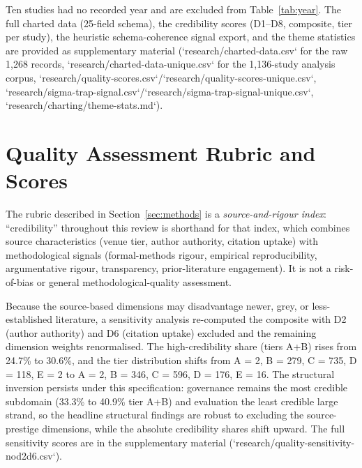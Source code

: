 Ten studies had no recorded year and are excluded from Table~\ref{tab:year}. The full charted data (25-field schema), the credibility scores (D1--D8, composite, tier per study), the heuristic schema-coherence signal export, and the theme statistics are provided as supplementary material (`research/charted-data.csv` for the raw 1,268 records, `research/charted-data-unique.csv` for the 1,136-study analysis corpus, `research/quality-scores.csv`/`research/quality-scores-unique.csv`, `research/sigma-trap-signal.csv`/`research/sigma-trap-signal-unique.csv`, `research/charting/theme-stats.md`).

\section{Quality Assessment Rubric and Scores}\label{app:quality}

The rubric described in Section~\ref{sec:methods} is a \emph{source-and-rigour index}: ``credibility'' throughout this review is shorthand for that index, which combines source characteristics (venue tier, author authority, citation uptake) with methodological signals (formal-methods rigour, empirical reproducibility, argumentative rigour, transparency, prior-literature engagement). It is not a risk-of-bias or general methodological-quality assessment.

Because the source-based dimensions may disadvantage newer, grey, or less-established literature, a sensitivity analysis re-computed the composite with D2 (author authority) and D6 (citation uptake) excluded and the remaining dimension weights renormalised. The high-credibility share (tiers A+B) rises from 24.7\% to 30.6\%, and the tier distribution shifts from A = 2, B = 279, C = 735, D = 118, E = 2 to A = 2, B = 346, C = 596, D = 176, E = 16. The structural inversion persists under this specification: governance remains the most credible subdomain (33.3\% to 40.9\% tier A+B) and evaluation the least credible large strand, so the headline structural findings are robust to excluding the source-prestige dimensions, while the absolute credibility shares shift upward. The full sensitivity scores are in the supplementary material (`research/quality-sensitivity-nod2d6.csv`).

